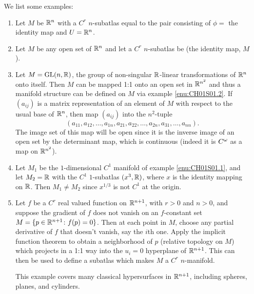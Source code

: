 \documentclass[../main]{subfiles}
\begin{document}
We list some examples:
\begin{enumerate}
    \item\label{enu:CH01S01.1} Let $M$ be $\mathbb{R}^n$ with a $C^r$ $n$-subatlas equal to the pair consisting of $\phi =$ the identity map and $U=\mathbb{R}^n$.
    
    \item\label{enu:CH01S01.2} Let $M$ be any open set of $\mathbb{R}^n$ and let a $C^r$ $n$-subatlas be (the identity map, $M$).
    
    \item\label{enu:CH01S01.3} Let $M = \mathrm{GL}(n, \mathbb{R})$, the group of non-singular $\mathbb{R}$-linear transformations of $\mathbb{R}^n$ onto itself. Then $M$ can be mapped 1:1 onto an open set in $\mathbb{R}^{n^2}$ and thus a manifold structure can be defined on $M$ via example \ref{enu:CH01S01.2}. If $(a_{ij})$ is a matrix representation of an element of $M$ with respect to the usual base of $\mathbb{R}^n$, then map $(a_{ij})$ into the $n^2$-tuple
    \[ (a_{11}, a_{12},\dots,a_{1n}, a_{21}, a_{22}, \dots, a_{2n}, a_{31}, \dots, a_{nn}). \]
    The image set of this map will be open since it is the inverse image of an open set by the determinant map, which is continuous (indeed it is $C^\omega$ as a map on $\mathbb{R}^{n^2}$).
    
    \item\label{enu:CH01S01.4} Let $M_1$ be the $1$-dimensional $C^1$ manifold of example \ref{enu:CH01S01.1}, and let $M_2 = \mathbb{R}$ with the $C^1$ $1$-subatlas $(x^3,\mathbb{R})$, where $x$ is the identity mapping on $\mathbb{R}$. Then $M_1 \ne M_2$ since $x^{1/3}$ is not $C^1$ at the origin.
    
    \item\label{enu:CH01S01.5} Let $f$ be a $C^r$ real valued function on $\mathbb{R}^{n+1}$, with $r>0$ and $n>0$, and suppose the gradient of $f$ does not vanish on an $f$-constant set \newline $M = \{p\in\mathbb{R}^{n+1}\colon f(p) = 0\}$. Then at each point in $M$, choose any partial derivative of $f$ that doesn't vanish, say the $i$th one. Apply the implicit function theorem to obtain a neighborhood of $p$ (relative topology on $M$) which projects in a 1:1 way into the $u_i = 0$ hyperplane of $\mathbb{R}^{n+1}$. This can then be used to define a subatlas which makes $M$ a $C^r$ $n$-manifold. %
    
    This example covers many classical hypersurfaces in $\mathbb{R}^{n+1}$, including sphe\-res, planes, and cylinders.
    

\end{enumerate}
\end{document}
